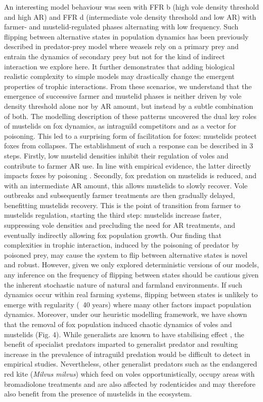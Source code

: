 \documentclass[11pt]{article}
\begin{document}
An interesting model behaviour was seen with FFR b (high vole density threshold and high AR) and FFR d (intermediate vole density threshold and low AR) with farmer- and mustelid-regulated phases alternating with low frequency. Such flipping between alternative states in population dynamics has been previously described in predator-prey model where weasels rely on a primary prey and entrain the dynamics of secondary prey \citep{Hanski1996} but not for the kind of indirect interaction we explore here. It further demonstrates that adding biological realistic complexity to simple models may drastically change the emergent properties of trophic interactions.
From these scenarios, we understand that the emergence of successive farmer and mustelid phases is neither driven by vole density threshold alone nor by AR amount, but instead by a subtle combination of both. The modelling description of these patterns uncovered the dual key roles of mustelids on fox dynamics, as intraguild competitors and as a vector for poisoning. This led to a surprising form of facilitation for foxes: mustelids protect foxes from collapses. The establishment of such a response can be described in 3 steps. Firstly, low mustelid densities inhibit their regulation of voles and contribute to farmer AR use. In line with empirical evidence, the latter directly impacts foxes by poisoning \citep{Jacquot2013}. Secondly, fox predation on mustelids is reduced, and with an intermediate AR amount, this allows mustelids to slowly recover. Vole outbreaks and subsequently farmer treatments are then gradually delayed, benefitting mustelids recovery. This is the point of transition from farmer to mustelids regulation, starting the third step: mustelids increase faster, suppressing vole densities and precluding the need for AR treatments, and eventually indirectly allowing fox population growth. Our finding that complexities in trophic interaction, induced by the poisoning of predator by poisoned prey, may cause the system to flip between alternative states is novel and robust. However, given we only explored deterministic versions of our models, any inference on the frequency of flipping between states should be cautious given the inherent stochastic nature of natural and farmland environments. If such dynamics occur within real farming systems, flipping between states is unlikely to emerge with regularity (~40 years) where many other factors impact population dynamics. Moreover, under our heuristic modelling framework, we have shown that the removal of fox population induced chaotic dynamics of voles and mustelids (Fig. 4). While generalists are known to have stabilising effect \citep{Hanski1991}, the benefit of specialist predators imparted to generalist predator and resulting increase in the prevalence of intraguild predation would be difficult to detect in empirical studies. Nevertheless, other generalist predators such as the endangered red kite (\textit{Milvus milvus}) which feed on voles opportunistically, occupy areas with bromadiolone treatments and are also affected by rodenticides \citep{Coeurdassier2014} and may therefore also benefit from the presence of mustelids in the ecosystem.
\end{document}
